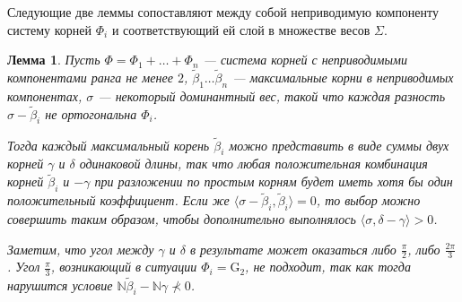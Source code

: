 \documentclass[12pt]{matmex-diploma}
\theoremstyle{mystyleni}
\theoremstyle{mystyle}
\newtheorem{lm}{Лемма}
\newcommand{\N}{\mathbb{N}}
\begin{document}
Следующие две леммы сопоставляют между собой неприводимую компоненту систему корней $\Phi_i$ и соответствующий ей слой в множестве весов $\Sigma$.

\begin{lm}\label{maxrootsum}
Пусть $\Phi=\Phi_1+\ldots+\Phi_n$ --- система корней с неприводимыми компонентами ранга не менее $2$, $\widetilde\beta_1 \ldots \widetilde\beta_n$ ---  максимальные корни в неприводимых компонентах, $\sigma$ --- некоторый доминантный вес, такой что каждая разность $\sigma-\widetilde\beta_i$ не ортогональна $\Phi_i$.

Тогда каждый максимальный корень $\widetilde\beta_i$ можно представить в виде суммы двух корней $\gamma$ и $\delta$ одинаковой длины, так что любая положительная комбинация корней $\widetilde\beta_i$ и $-\gamma$ при разложении по простым корням будет иметь хотя бы один положительный коэффициент.
Если же $\langle\sigma-\widetilde\beta_i,\widetilde\beta_i\rangle=0$, то выбор можно совершить таким образом, чтобы дополнительно выполнялось $\langle\sigma,\delta-\gamma\rangle>0$.

Заметим, что угол между $\gamma$ и $\delta$ в результате может оказаться либо $\frac{\pi}{2}$, либо $\frac{2\pi}{3}$. Угол $\frac{\pi}{3}$, возникающий в ситуации $\Phi_i = \mathrm{G}_2$, не подходит, так как тогда нарушится условие $\N\widetilde\beta_i-\N\gamma \nprec 0$.
\end{lm}
\end{document}
